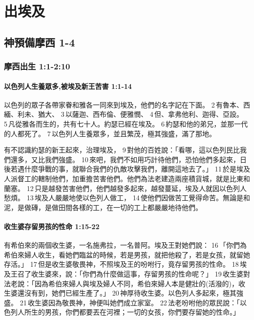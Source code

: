 \chapter{出埃及}
\vspace{-1 cm}
\section{神預備摩西 1-4 }
\subsection{摩西出生 1:1-2:10}
\noindent
\subsubsection{以色列人生養眾多,被埃及新王苦害 1:1-14}
以色列的眾子各帶家眷和雅各一同來到埃及，他們的名字記在下面。 2 有魯本、西緬、利未、猶大、 3 以薩迦、西布倫、便雅憫、 4 但、拿弗他利、迦得、亞設。 5 凡從雅各而生的，共有七十人。約瑟已經在埃及。 6 約瑟和他的弟兄，並那一代的人都死了。 7 以色列人生養眾多，並且繁茂，極其強盛，滿了那地。

有不認識約瑟的新王起來，治理埃及， 9 對他的百姓說：「看哪，這以色列民比我們還多，又比我們強盛。 10 來吧，我們不如用巧計待他們，恐怕他們多起來，日後若遇什麼爭戰的事，就聯合我們的仇敵攻擊我們，離開這地去了。」 11 於是埃及人派督工的轄制他們，加重擔苦害他們。他們為法老建造兩座積貨城，就是比東和蘭塞。 12 只是越發苦害他們，他們越發多起來，越發蔓延，埃及人就因以色列人愁煩。 13 埃及人嚴嚴地使以色列人做工， 14 使他們因做苦工覺得命苦。無論是和泥，是做磚，是做田間各樣的工，在一切的工上都嚴嚴地待他們。

\subsubsection{收生婆存留男孩的性命 1:15-22}
\noindent
有希伯來的兩個收生婆，一名施弗拉，一名普阿。埃及王對她們說： 16 「你們為希伯來婦人收生，看她們臨盆的時候，若是男孩，就把他殺了，若是女孩，就留她存活。」 17 但是收生婆敬畏神，不照埃及王的吩咐行，竟存留男孩的性命。 18 埃及王召了收生婆來，說：「你們為什麼做這事，存留男孩的性命呢？」 19 收生婆對法老說：「因為希伯來婦人與埃及婦人不同，希伯來婦人本是健壯的(活潑的)，收生婆還沒有到，她們已經生產了。」 20 神厚待收生婆。以色列人多起來，極其強盛。 21 收生婆因為敬畏神，神便叫她們成立家室。 22 法老吩咐他的眾民說：「以色列人所生的男孩，你們都要丟在河裡；一切的女孩，你們要存留她的性命。」

